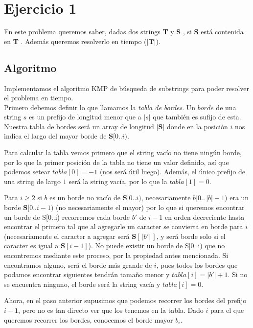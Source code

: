 \section{Ejercicio 1}

\newcommand\sS{ \textbf{S} }
\newcommand\sT{ \textbf{T} }

En este problema queremos saber, dadas dos strings \sT y \sS, si \sS está contenida en \sT. Además queremos resolverlo en tiempo \bigo($|\sT|$).

\subsection{Algoritmo}

Implementamos el algoritmo KMP de búsqueda de substrings para poder resolver el problema en tiempo.
\\

Primero debemos definir lo que llamamos la \textit{tabla de bordes}. Un $borde$ de una string $s$ es un prefijo de longitud menor que a $|s|$ que también es sufijo de esta. Nuestra tabla de bordes será un array de longitud $|\sS|$ donde en la posición $i$ nos indica el largo del mayor borde de $\sS[0..i)$.

    Para calcular la tabla vemos primero que el string vacío no tiene ningún borde, por lo que la primer posición de la tabla no tiene un valor definido, así que podemos setear $tabla[0] = -1$ (nos será útil luego). Además, el único prefijo de una string de largo $1$ será la string vacía, por lo que la $tabla[1] = 0$.

Para $i \geq 2$ si $b$ es un borde no vacío de $\sS[0..i)$, necesariamente $b[0.. \,|b|-1)$ era un borde $\sS[0..i-1)$ (no necesariamente el mayor) por lo que si queremos encontrar un borde de S[0..i) recorremos cada borde $b'$ de $i-1$ en orden decreciente hasta encontrar el primero tal que al agregarle un caracter se convierta en borde para $i$ (necesariamente el caracter a agregar será $\sS[ \,|b'|\, ]$, y será borde solo si el caracter es igual a $\sS[i-1]$).
No puede existir un borde de S[0..i) que no encontremos mediante este proceso, por la propiedad antes mencionada.
Si encontramos alguno, será el borde más grande de $i$, pues todos los bordes que podamos encontrar siguientes tendrán tamaño menor y $tabla[i] = |b'| + 1$. Si no se encuentra ninguno, el borde será la string vacía y $tabla[i] = 0$.

Ahora, en el paso anterior supusimos que podemos recorrer los bordes del prefijo $i-1$, pero no es tan directo ver que los tenemos en la tabla. Dado $i$ para el que queremos recorrer los bordes, conocemos el borde mayor $b_i$.

